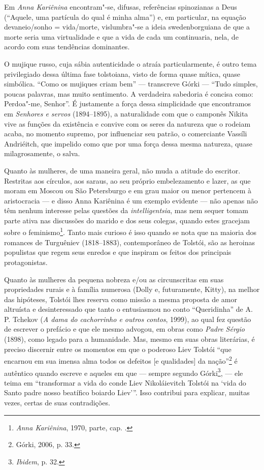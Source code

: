 {{Em \emph{Anna Kariênina} encontram"-se, difusas, referências
spinozianas a Deus (``Aquele, uma partícula do qual é minha
alma'') e, em particular, na equação
devaneio/sonho = vida/morte, vislumbra"-se a ideia swedenborguiana de que
a morte seria uma virtualidade e que a vida de cada um continuaria,
nela, de acordo com suas tendências dominantes.

O mujique russo, cuja sábia autenticidade o atraía particularmente,
é outro tema privilegiado dessa última fase tolstoiana, visto de
forma quase mítica, quase simbólica. ``Como os mujiques criam bem''
--- transcreve Górki --- ``Tudo simples, poucas palavras, mas muito
sentimento. A verdadeira sabedoria é concisa como: Perdoa"-me, Senhor''.
É justamente a força dessa simplicidade que encontramos
em \emph{Senhores e servos} (1894--1895), a naturalidade com que o
camponês Nikita vive as funções da existência e convive com os seres da
natureza que o rodeiam acaba, no momento supremo, por influenciar seu
patrão, o comerciante Vassíli Andriéitch, que impelido como que por uma
força dessa mesma natureza, quase milagrosamente, o salva.

Quanto às mulheres, de uma maneira geral, não muda a atitude do
escritor. Restritas aos círculos, aos saraus, ao seu próprio
embelezamento e lazer, as que moram em Moscou ou São Petersburgo e em
grau maior ou menor pertencem à aristocracia --- e disso Anna Kariênina é
um exemplo evidente --- não apenas não têm nenhum interesse pelas
questões da \emph{intelligentsia}, mas nem sequer tomam parte ativa nas
discussões do marido e dos seus colegas, quando estes gracejam sobre o
feminismo\footnote{\emph{Anna Kariênina}, 1970,  parte, cap. .}. Tanto mais
curioso é isso quando se nota que na maioria dos romances de Turguêniev
(1818--1883), contemporâneo de Tolstói, são as heroinas populistas
que regem seus enredos e que inspiram os feitos dos principais
protagonistas.

Quanto às mulheres da pequena nobreza e/ou as circunscritas em
suas propriedades rurais e à família numerosa (Dolly e, futuramente,
Kitty), na melhor das hipóteses, Tolstói lhes reserva como missão a
mesma proposta de amor altruísta e desinteressado que tanto o
entusiasmou no conto ``Queridinha'' de A. P. Tchekov (\emph{A dama do
cachorrinho e outros contos}, 1999), ao qual fez questão de escrever o
prefácio e que ele mesmo advogou, em obras como \emph{Padre Sérgio} (1898), como legado para a humanidade. Mas, mesmo em suas obras
literárias, é preciso discernir entre os momentos em que o
poderoso Liev Tolstói ``que encarnou em sua imensa alma todos os
defeitos [e qualidades] da nação''\footnote{Górki, 2006, p. 33.} é autêntico
quando escreve e aqueles em que --- sempre segundo Górki\footnote{\emph{Ibidem}, p. 32.},
--- ele teima em ``transformar a vida do conde Liev Nikoláievitch
Tolstói na ‘vida do Santo padre nosso beatífico boiardo Liev’''. Isso
contribui para explicar, muitas vezes, certas de suas contradições.

}}
